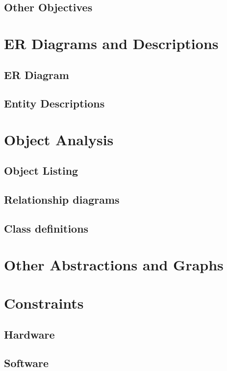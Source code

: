 \subsection{Other Objectives}

\section{ER Diagrams and Descriptions}

\subsection{ER Diagram}

\subsection{Entity Descriptions}

\section{Object Analysis}

\subsection{Object Listing}

\subsection{Relationship diagrams}

\subsection{Class definitions}

\section{Other Abstractions and Graphs}

\section{Constraints}

\subsection{Hardware}

\subsection{Software}

